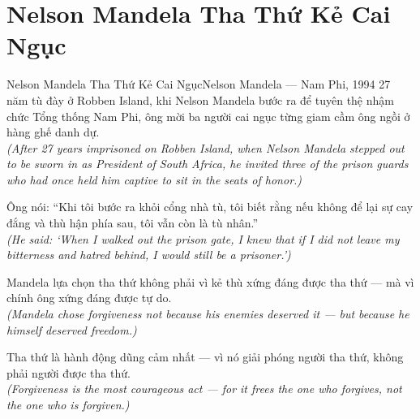 \section{Nelson Mandela Tha Thứ Kẻ Cai Ngục}
\begin{truyen}{Nelson Mandela Tha Thứ Kẻ Cai Ngục}{Nelson Mandela --- Nam Phi, 1994}
 27 năm tù đày ở Robben Island, khi Nelson Mandela bước ra để tuyên thệ nhậm chức Tổng thống Nam Phi, ông mời ba người cai ngục từng giam cầm ông ngồi ở hàng ghế danh dự.\\[4pt]
\textit{(After 27 years imprisoned on Robben Island, when Nelson Mandela stepped out to be sworn in as President of South Africa, he invited three of the prison guards who had once held him captive to sit in the seats of honor.)}

Ông nói: ``Khi tôi bước ra khỏi cổng nhà tù, tôi biết rằng nếu không để lại sự cay đắng và thù hận phía sau, tôi vẫn còn là tù nhân.''\\[4pt]
\textit{(He said: `When I walked out the prison gate, I knew that if I did not leave my bitterness and hatred behind, I would still be a prisoner.')}

Mandela lựa chọn tha thứ không phải vì kẻ thù xứng đáng được tha thứ --- mà vì chính ông xứng đáng được tự do.\\[4pt]
\textit{(Mandela chose forgiveness not because his enemies deserved it --- but because he himself deserved freedom.)}

\end{truyen}
\begin{baihoc}
  Tha thứ là hành động dũng cảm nhất --- vì nó giải phóng người tha thứ, không phải người được tha thứ.\\[4pt]
  \textit{(Forgiveness is the most courageous act --- for it frees the one who forgives, not the one who is forgiven.)}
\end{baihoc}

